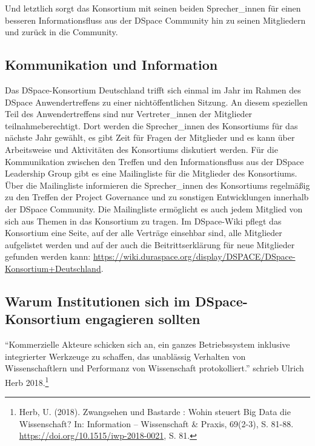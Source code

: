 \documentclass[a4paper,
fontsize=11pt,
oneside,
numbers=noperiodatend,
parskip=half-,
bibliography=totoc,
final
]{scrartcl}
\begin{document}
Und letztlich sorgt das Konsortium mit seinen beiden Sprecher\_innen für
einen besseren Informationsfluss aus der DSpace Community hin zu seinen
Mitgliedern und zurück in die Community.

\hypertarget{kommunikation-und-information}{%
\subsection{Kommunikation und
Information}\label{kommunikation-und-information}}

Das DSpace-Konsortium Deutschland trifft sich einmal im Jahr im Rahmen
des DSpace Anwendertreffens zu einer nichtöffentlichen Sitzung. An
diesem speziellen Teil des Anwendertreffens sind nur Vertreter\_innen
der Mitglieder teilnahmeberechtigt. Dort werden die Sprecher\_innen des
Konsortiums für das nächste Jahr gewählt, es gibt Zeit für Fragen der
Mitglieder und es kann über Arbeitsweise und Aktivitäten des Konsortiums
diskutiert werden. Für die Kommunikation zwischen den Treffen und den
Informationsfluss aus der DSpace Leadership Group gibt es eine
Mailingliste für die Mitglieder des Konsortiums. Über die Mailingliste
informieren die Sprecher\_innen des Konsortiums regelmäßig zu den
Treffen der Project Governance und zu sonstigen Entwicklungen innerhalb
der DSpace Community. Die Mailingliste ermöglicht es auch jedem Mitglied
von sich aus Themen in das Konsortium zu tragen. Im DSpace-Wiki pflegt
das Konsortium eine Seite, auf der alle Verträge einsehbar sind, alle
Mitglieder aufgelistet werden und auf der auch die Beitrittserklärung
für neue Mitglieder gefunden werden kann:
\url{https://wiki.duraspace.org/display/DSPACE/DSpace-Konsortium+Deutschland}.

\hypertarget{warum-institutionen-sich-im-dspace-konsortium-engagieren-sollten}{%
\subsection{Warum Institutionen sich im DSpace-Konsortium engagieren
sollten}\label{warum-institutionen-sich-im-dspace-konsortium-engagieren-sollten}}

\enquote{Kommerzielle Akteure schicken sich an, ein ganzes
Betriebssystem inklusive integrierter Werkzeuge zu schaffen, das
unablässig Verhalten von Wissenschaftlern und Performanz von
Wissenschaft protokolliert.} schrieb Ulrich Herb 2018.\footnote{Herb, U.
  (2018). Zwangsehen und Bastarde : Wohin steuert Big Data die
  Wissenschaft? In: Information -- Wissenschaft \& Praxis, 69(2-3), S.
  81-88. \url{https://doi.org/10.1515/iwp-2018-0021}, S. 81.}
\end{document}
